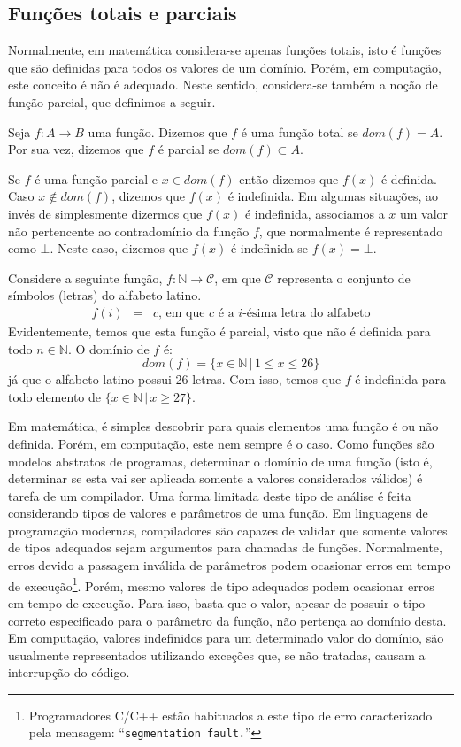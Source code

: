 \subsection{Funções totais e parciais}

Normalmente, em matemática considera-se apenas funções totais, isto é
funções que são definidas para todos os valores de um domínio. Porém,
em computação, este conceito é não é adequado. Neste sentido,
considera-se também a noção de função parcial, que definimos a seguir.

\begin{Definition}
Seja $f : A \to B$ uma função. Dizemos que $f$ é uma função total se
$dom(f) = A$. Por sua vez, dizemos que $f$ é parcial se $dom(f)
\subset A$.
\end{Definition}

Se $f$ é uma função parcial e $x\in dom(f)$ então dizemos que $f(x)$ é
definida. Caso $x\not\in dom(f)$, dizemos que $f(x)$ é
indefinida. Em algumas situações, ao invés de simplesmente dizermos
que $f(x)$ é indefinida, associamos a $x$ um valor não pertencente ao
contradomínio da função $f$, que normalmente é representado como
$\bot$. Neste caso, dizemos que $f(x)$ é indefinida se $f(x) = \bot$.

\begin{Example}
Considere a seguinte função, $f : \mathbb{N} \to \mathcal{C}$, em que
$\mathcal{C}$ representa o conjunto de símbolos (letras) do alfabeto latino.
\[
\begin{array}{lcl}
f(i) & = & c \text{, em que $c$ é a $i$-ésima letra do alfabeto}
\end{array}
\]
Evidentemente, temos que esta função é parcial, visto que não é
definida para todo $n \in \mathbb{N}$. O domínio de $f$ é:
\[
dom(f) =\{x \in\mathbb{N}\,|\,1 \leq x \leq 26\}
\]
já que o alfabeto latino possui 26 letras. Com isso, temos que $f$ é
indefinida para todo elemento de $\{x\in\mathbb{N}\,|\,x \geq 27\}$.
\end{Example}
Em matemática, é simples descobrir para quais elementos uma função é
ou não definida. Porém, em computação, este nem sempre é o
caso. Como funções são modelos abstratos de programas, determinar o
domínio de uma função (isto é, determinar se esta vai ser aplicada
somente a valores considerados válidos) é tarefa de um compilador.
Uma forma limitada deste tipo de análise é feita considerando tipos de valores e
parâmetros de uma função. Em linguagens de programação modernas,
compiladores são capazes de validar que somente valores de tipos
adequados sejam argumentos para chamadas de funções. Normalmente,
erros devido a passagem inválida de parâmetros podem ocasionar erros
em tempo de execução\footnote{Programadores C/C++ estão habituados a
  este tipo de erro caracterizado pela mensagem:
  ``\texttt{segmentation fault.}''}. Porém, mesmo valores de tipo
adequados podem ocasionar erros em tempo de execução. Para isso, basta
que o valor, apesar de possuir o tipo correto especificado para o
parâmetro da função, não pertença ao domínio desta. Em computação,
valores indefinidos para um determinado valor do domínio, são
usualmente representados utilizando exceções que, se não tratadas,
causam a interrupção do código.

